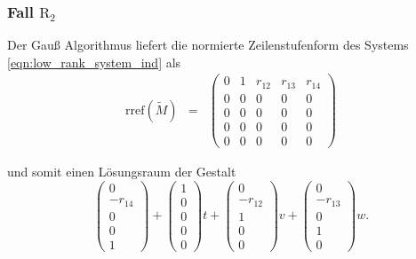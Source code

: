 \documentclass[a4paper,oneside, 11pt, openany%
]{article}
\theoremstyle{custom}
\theoremstyle{custom}
\begin{document}
\subsubsection*{Fall $\text{R}_{2}$}
Der Gauß Algorithmus liefert die normierte Zeilenstufenform des Systems \eqref{eqn:low_rank_system_ind} als
\begin{equation*}\label{eqn:rref_r2}
	\begin{alignedat}{-1}
		\text{rref}(\tilde{M}) &=& 
		\left( \begin{array}{ccccc}				
			0&1&r_{12}&r_{13}&r_{14}\\
			0&0&0&0&0\\
			0&0&0&0&0\\
			0&0&0&0&0\\
			0&0&0&0&0
		\end{array}
		\right)
	\end{alignedat}
\end{equation*}

und somit einen Lösungsraum der Gestalt
\begin{equation*}
	\begin{pmatrix}
		0\\
		-r_{14}\\
		0\\
		0\\
		1
	\end{pmatrix} +
	\begin{pmatrix}
		1\\
		0\\
		0\\
		0\\
		0
	\end{pmatrix}t +
	\begin{pmatrix}
		0\\
		-r_{12}\\
		1\\
		0\\
		0
	\end{pmatrix}v +
	\begin{pmatrix}
		0\\
		-r_{13}\\
		0\\
		1\\
		0
	\end{pmatrix}w.
\end{equation*}
\end{document}
